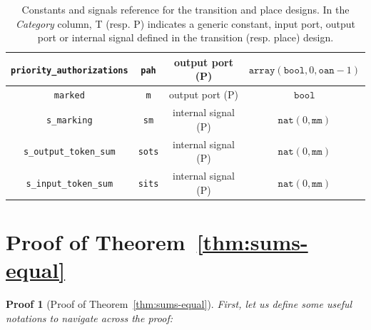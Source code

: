 \documentclass[pdflatex,sn-mathphys]{sn-jnl}%
\theoremstyle{thmstyleone}%
\theoremstyle{thmstyletwo}%
\newtheorem*{pf}{Proof}%
\theoremstyle{thmstylethree}%
\begin{document}
\begin{appendices}
\begin{table}[h]
{\begin{tabular}{|c|c|c|c|}
    \hline
    \texttt{priority\_authorizations} & \texttt{pah} & output port (P) & $\mathtt{array}(\mathtt{bool},0,\mathtt{oan}-1)$ \\
    \hline
    \texttt{marked} & \texttt{m} & output port (P) & $\mathtt{bool}$ \\
    \hline
    \texttt{s\_marking} & \texttt{sm} & internal signal (P) & $\mathtt{nat}(0,\mathtt{mm})$ \\
    \hline
    \texttt{s\_output\_token\_sum} & \texttt{sots} & internal signal (P) & $\mathtt{nat}(0,\mathtt{mm})$ \\
    \hline
    \texttt{s\_input\_token\_sum} & \texttt{sits} & internal signal (P) & $\mathtt{nat}(0,\mathtt{mm})$ \\
    \hline
  \end{tabular}}
\caption[Constants and signals reference for the \hvhdl{}
\texttt{transition} and \texttt{place} designs.]{Constants and signals
  reference for the \hvhdl{} transition and place designs. In the
  \textit{Category} column, T (resp. P) indicates a generic constant,
  input port, output port or internal signal defined in the transition
  (resp. place) design. }
  \label{tab:consts-and-sigs-ref}
\end{table}

\section{Proof of Theorem~\ref{thm:sums-equal}}
\label{sec:sums-equal-pf}

\begin{pf}[Proof of Theorem~\ref{thm:sums-equal}]

  First, let us define some useful notations to navigate across
  the proof:


\end{pf}
\end{appendices}
\end{document}
